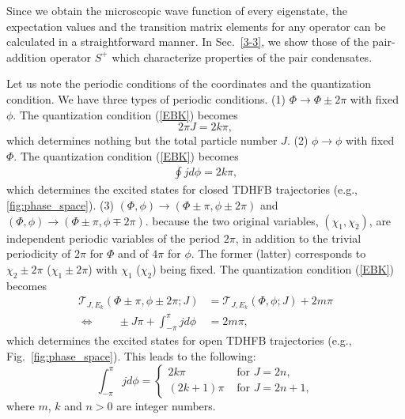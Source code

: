 \documentclass[11pt]{book} %
\begin{document}
Since we obtain the microscopic wave function of every eigenstate,
the expectation values and the transition matrix elements for any operator
can be calculated in a straightforward manner.
In Sec.~\ref{3-3}, we show those of the pair-addition operator
$S^+$ which characterize properties of the pair condensates.

Let us note the periodic conditions
of the coordinates and the quantization condition.
We have three types of periodic conditions. (1) $\Phi\rightarrow \Phi\pm 2\pi$ with fixed $\phi$. The quantization condition (\ref{EBK}) becomes
\begin{equation}
	2\pi J = 2k \pi ,
\end{equation}
which determines nothing but the total particle number $J$. (2) $\phi\rightarrow \phi$ with fixed $\Phi$. The quantization condition (\ref{EBK}) becomes
\begin{align}
	\oint j d\phi = 2k \pi ,
\end{align}
which determines the excited states for closed TDHFB trajectories (e.g., 
\ref{fig:phase_space}). (3) $(\Phi,\phi)\rightarrow (\Phi\pm \pi,\phi\pm 2\pi)$ and
$(\Phi,\phi)\rightarrow (\Phi\pm \pi,\phi\mp 2\pi)$.
because the two original variables, $(\chi_1,\chi_2)$,
are independent periodic variables of the period $2\pi$,
in addition to the trivial periodicity of $2\pi$ for $\Phi$ and of $4\pi$
for $\phi$.
The former (latter) corresponds to $\chi_2\pm 2\pi$ ($\chi_1\pm 2\pi$)
with $\chi_1$ ($\chi_2$) being fixed.
The quantization condition (\ref{EBK}) becomes
\begin{align}
 \mathcal{T}_{J,E_k}(\Phi\pm\pi,\phi\pm 2\pi;J) &= \mathcal{T}_{J,E_k}(\Phi,\phi;J) + 2m\pi \nonumber \\
	 \Leftrightarrow \quad\quad \pm J \pi + \int_{-\pi}^\pi j d\phi
	&= 2m\pi ,
\end{align}
which determines the excited states for open TDHFB trajectories (e.g., Fig.~\ref{fig:phase_space}).
This leads to the following:
\begin{equation}
	\int_{-\pi}^\pi j d\phi = 
	\begin{cases}
		2k\pi & \mbox{ for } J=2n ,\\
		(2k+1)\pi & \mbox{ for } J=2n+1 ,
	\end{cases}
	\label{EBK_2}
\end{equation}
where $m$, $k$ and $n>0$ are integer numbers.
\end{document}
